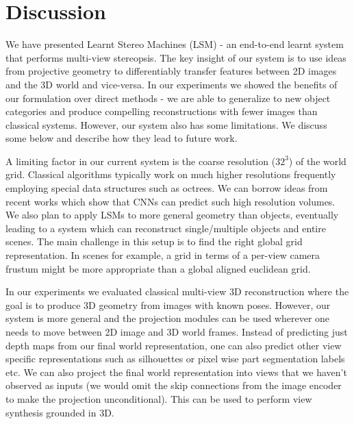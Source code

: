 \documentclass[../thesis.tex]{subfiles}
\begin{document}



\section{Discussion}
We have presented Learnt Stereo Machines (LSM) - an end-to-end learnt system that performs multi-view stereopsis. The key insight of our system is to use ideas from projective geometry to differentiably transfer features between 2D images and the 3D world and vice-versa. In our experiments we showed the benefits of our formulation over direct methods - we are able to generalize to new object categories and produce compelling reconstructions with fewer images than classical systems. However, our system also has some limitations. We discuss some below and describe how they lead to future work.

A limiting factor in our current system is the coarse resolution ($32^3$) of the world grid. Classical algorithms typically work on much higher resolutions frequently employing special data structures such as octrees. We can borrow ideas from recent works \cite{riegler2017octnetfusion,hane2017hierarchical} which show that CNNs can predict such high resolution volumes. We also plan to apply LSMs to more general geometry than objects, eventually leading to a system which can reconstruct single/multiple objects and entire scenes. The main challenge in this setup is to find the right global grid representation. In scenes for example, a grid in terms of a per-view camera frustum might be more appropriate than a global aligned euclidean grid.

In our experiments we evaluated classical multi-view 3D reconstruction where the goal is to produce 3D geometry from images with known poses. However, our system is more general and the projection modules can be used wherever one needs to move between 2D image and 3D world frames. Instead of predicting just depth maps from our final world representation, one can also predict other view specific representations such as silhouettes or pixel wise part segmentation labels etc. We can also project the final world representation into views that we haven't observed as inputs (we would omit the skip connections from the image encoder to make the projection unconditional). This can be used to perform view synthesis grounded in 3D.
\end{document}
